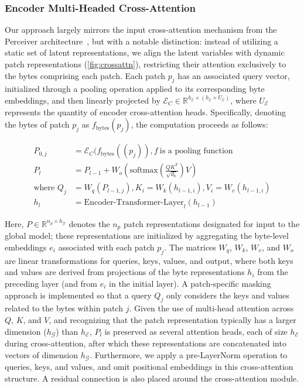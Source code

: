 \subsubsection{Encoder Multi-Headed Cross-Attention}
\label{sec:enc-cross-attn}
Our approach largely mirrors the input cross-attention mechanism from the Perceiver architecture~\citep{jaegle2021perceiver}, but with a notable distinction: instead of utilizing a static set of latent representations, we align the latent variables with dynamic patch representations (\autoref{fig:crossattn}), restricting their attention exclusively to the bytes comprising each patch. Each patch $p_j$ has an associated query vector, initialized through a pooling operation applied to its corresponding byte embeddings, and then linearly projected by $\mathcal{E}_{C} \in \mathbb{R}^{h_{\mathcal{E}} \times (h_{\mathcal{E}} \times U_{\mathcal{E}})}$, where $U_{\mathcal{E}}$ represents the quantity of encoder cross-attention heads. Specifically, denoting the bytes of patch $p_j$ as $f_{\text{bytes}}(p_j)$, the computation proceeds as follows:

\begin{align}
P_{0,j} &= \mathcal{E}_{C}(f_\text{bytes}((p_j)), f~ \text{is a pooling function} \\
P_l &= P_{l-1} + W_o\left(\text{softmax}\left(\frac{QK^T}{\sqrt{d_k}}\right)V\right) \\
\text{where } Q_j &= W_q(P_{l-1,j}), K_i = W_k(h_{l-1,i}), V_i = W_v(h_{l-1,i}) \\
h_l &= \text{Encoder-Transformer-Layer}_l(h_{l-1})
\end{align}

Here, $P \in \mathbb{R}^{n_p \times h_{\mathcal{G}}}$ denotes the $n_p$ patch representations designated for input to the global model; these representations are initialized by aggregating the byte-level embeddings $e_i$ associated with each patch $p_j$. The matrices $W_q$, $W_k$, $W_v$, and $W_o$ are linear transformations for queries, keys, values, and output, where both keys and values are derived from projections of the byte representations $h_i$ from the preceding layer (and from $e_i$ in the initial layer). A patch-specific masking approach is implemented so that a query $Q_j$ only considers the keys and values related to the bytes within patch $j$. Given the use of multi-head attention across $Q$, $K$, and $V$, and recognizing that the patch representation typically has a larger dimension ($h_{\mathcal{G}}$) than $h_{\mathcal{E}}$, $P_l$ is preserved as several attention heads, each of size $h_{\mathcal{E}}$ during cross-attention, after which these representations are concatenated into vectors of dimension $h_{\mathcal{G}}$. Furthermore, we apply a pre-LayerNorm operation to queries, keys, and values, and omit positional embeddings in this cross-attention structure. A residual connection is also placed around the cross-attention module.

